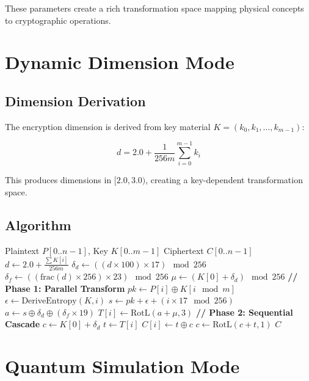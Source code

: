 \documentclass[11pt,a4paper]{article}
\begin{document}
These parameters create a rich transformation space mapping physical concepts to cryptographic operations.

\section{Dynamic Dimension Mode}

\subsection{Dimension Derivation}

The encryption dimension is derived from key material $K = (k_0, k_1, \ldots, k_{m-1})$:

\begin{equation}
d = 2.0 + \frac{1}{256m}\sum_{i=0}^{m-1} k_i
\end{equation}

This produces dimensions in $[2.0, 3.0)$, creating a key-dependent transformation space.

\subsection{Algorithm}

\begin{algorithm}
\caption{Dynamic Dimension Encryption}
\begin{algorithmic}[1]
\Require Plaintext $P[0..n-1]$, Key $K[0..m-1]$
\Ensure Ciphertext $C[0..n-1]$
\State $d \gets 2.0 + \frac{\sum K[i]}{256m}$
\State $\delta_d \gets ((d \times 100) \times 17) \mod 256$
\State $\delta_f \gets ((\text{frac}(d) \times 256) \times 23) \mod 256$
\State $\mu \gets (K[0] + \delta_d) \mod 256$
\State \textbf{// Phase 1: Parallel Transform}
    \State $pk \gets P[i] \oplus K[i \mod m]$
    \State $\epsilon \gets \text{DeriveEntropy}(K, i)$
    \State $s \gets pk + \epsilon + (i \times 17 \mod 256)$
    \State $a \gets s \oplus \delta_d \oplus (\delta_f \times 19)$
    \State $T[i] \gets \text{RotL}(a + \mu, 3)$
\EndFor
\State \textbf{// Phase 2: Sequential Cascade}
\State $c \gets K[0] + \delta_d$
    \State $t \gets T[i]$
    \State $C[i] \gets t \oplus c$
    \State $c \gets \text{RotL}(c + t, 1)$
\EndFor
\State \Return $C$
\end{algorithmic}
\end{algorithm}

\section{Quantum Simulation Mode}
\end{document}
